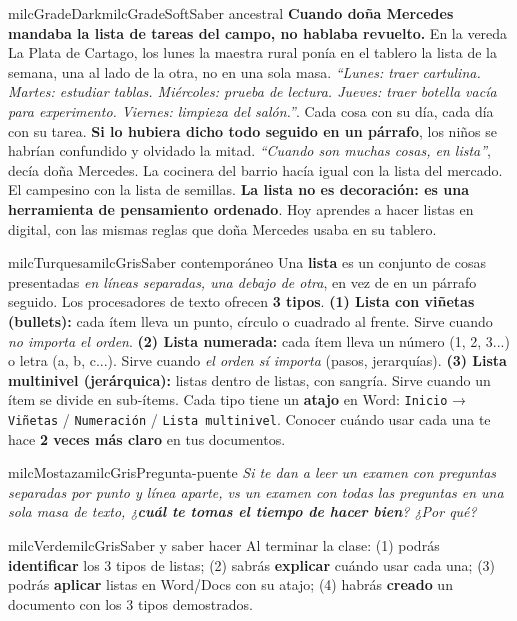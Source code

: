 \documentclass[11pt,letterpaper]{article}
\begin{document}
\begin{softbox}{milcGradeDark}{milcGradeSoft}{Saber ancestral}
\textbf{Cuando doña Mercedes mandaba la lista de tareas del campo, no hablaba revuelto.} En la vereda La Plata de Cartago, los lunes la maestra rural ponía en el tablero la lista de la semana, una al lado de la otra, no en una sola masa. \emph{``Lunes: traer cartulina. Martes: estudiar tablas. Miércoles: prueba de lectura. Jueves: traer botella vacía para experimento. Viernes: limpieza del salón.''}. Cada cosa con su día, cada día con su tarea. \textbf{Si lo hubiera dicho todo seguido en un párrafo}, los niños se habrían confundido y olvidado la mitad. \emph{``Cuando son muchas cosas, en lista''}, decía doña Mercedes. La cocinera del barrio hacía igual con la lista del mercado. El campesino con la lista de semillas. \textbf{La lista no es decoración: es una herramienta de pensamiento ordenado}. Hoy aprendes a hacer listas en digital, con las mismas reglas que doña Mercedes usaba en su tablero.
\end{softbox}

\begin{softbox}{milcTurquesa}{milcGris}{Saber contemporáneo}
Una \textbf{lista} es un conjunto de cosas presentadas \emph{en líneas separadas, una debajo de otra}, en vez de en un párrafo seguido. Los procesadores de texto ofrecen \textbf{3 tipos}. \textbf{(1) Lista con viñetas (bullets):} cada ítem lleva un punto, círculo o cuadrado al frente. Sirve cuando \emph{no importa el orden}. \textbf{(2) Lista numerada:} cada ítem lleva un número (1, 2, 3...) o letra (a, b, c...). Sirve cuando \emph{el orden sí importa} (pasos, jerarquías). \textbf{(3) Lista multinivel (jerárquica):} listas dentro de listas, con sangría. Sirve cuando un ítem se divide en sub-ítems. Cada tipo tiene un \textbf{atajo} en Word: \texttt{Inicio} → \texttt{Viñetas} / \texttt{Numeración} / \texttt{Lista multinivel}. Conocer cuándo usar cada una te hace \textbf{2 veces más claro} en tus documentos.
\end{softbox}

\begin{softbox}{milcMostaza}{milcGris}{Pregunta-puente}
\textit{Si te dan a leer un examen con preguntas separadas por punto y línea aparte, vs un examen con todas las preguntas en una sola masa de texto, ¿\textbf{cuál te tomas el tiempo de hacer bien}? ¿Por qué?}
\end{softbox}

\begin{softbox}{milcVerde}{milcGris}{Saber y saber hacer}
Al terminar la clase: (1) podrás \textbf{identificar} los 3 tipos de listas; (2) sabrás \textbf{explicar} cuándo usar cada una; (3) podrás \textbf{aplicar} listas en Word/Docs con su atajo; (4) habrás \textbf{creado} un documento con los 3 tipos demostrados.
\end{softbox}
\end{document}
